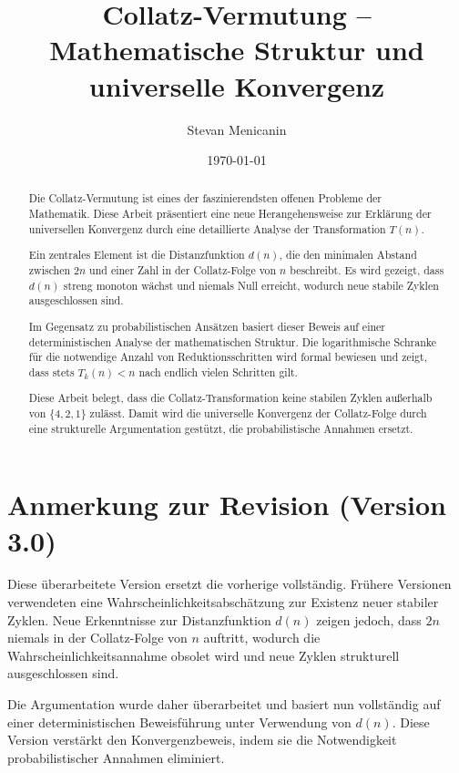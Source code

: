 \documentclass[a4paper,12pt]{article}
\title{Collatz-Vermutung – Mathematische Struktur und universelle Konvergenz}
\author{Stevan Menicanin}
\date{\today}
\begin{document}
\maketitle

\section*{Anmerkung zur Revision (Version 3.0)}
Diese überarbeitete Version ersetzt die vorherige vollständig. Frühere Versionen verwendeten eine Wahrscheinlichkeitsabschätzung zur Existenz neuer stabiler Zyklen. Neue Erkenntnisse zur Distanzfunktion $d(n)$ zeigen jedoch, dass $2n$ niemals in der Collatz-Folge von $n$ auftritt, wodurch die Wahrscheinlichkeitsannahme obsolet wird und neue Zyklen strukturell ausgeschlossen sind.

Die Argumentation wurde daher überarbeitet und basiert nun vollständig auf einer deterministischen Beweisführung unter Verwendung von $d(n)$. Diese Version verstärkt den Konvergenzbeweis, indem sie die Notwendigkeit probabilistischer Annahmen eliminiert.

\begin{abstract}
    Die Collatz-Vermutung ist eines der faszinierendsten offenen Probleme der Mathematik. Diese Arbeit präsentiert eine neue Herangehensweise zur Erklärung der universellen Konvergenz durch eine detaillierte Analyse der Transformation $T(n)$. 
    
    Ein zentrales Element ist die Distanzfunktion $d(n)$, die den minimalen Abstand zwischen $2n$ und einer Zahl in der Collatz-Folge von $n$ beschreibt. Es wird gezeigt, dass $d(n)$ streng monoton wächst und niemals Null erreicht, wodurch neue stabile Zyklen ausgeschlossen sind.
    
    Im Gegensatz zu probabilistischen Ansätzen basiert dieser Beweis auf einer deterministischen Analyse der mathematischen Struktur. Die logarithmische Schranke für die notwendige Anzahl von Reduktionsschritten wird formal bewiesen und zeigt, dass stets $T_k(n) < n$ nach endlich vielen Schritten gilt. 
    
    Diese Arbeit belegt, dass die Collatz-Transformation keine stabilen Zyklen außerhalb von $\{4, 2, 1\}$ zulässt. Damit wird die universelle Konvergenz der Collatz-Folge durch eine strukturelle Argumentation gestützt, die probabilistische Annahmen ersetzt.
\end{abstract}


\newpage
\tableofcontents

\clearpage
\end{document}
